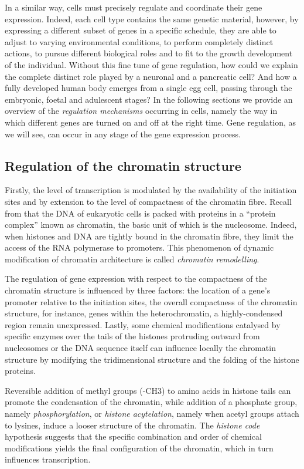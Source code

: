 In a similar way, cells must precisely regulate and coordinate their gene expression. Indeed, each cell type contains the same genetic material, however, by expressing a different subset of genes in a specific schedule, they are able to adjust to varying environmental conditions, to perform completely distinct actions, to pursue different biological roles and to fit to the growth development of the individual. Without this fine tune of gene regulation, how could we explain the complete distinct role played by a neuronal and a pancreatic cell? And how a fully developed human body emerges from a single egg cell, passing through the embryonic, foetal and adulescent stages? In the following sections we provide an overview of the \textit{regulation mechanisms} occurring in cells,  namely the way in which different genes are turned on and off at the right time. Gene regulation, as we will see, can occur in any stage of the gene expression process.

\subsection{Regulation of the chromatin structure}
Firstly, the level of transcription is modulated by the availability of the initiation sites and by extension to the level of compactness of the chromatin fibre.  Recall from   that the DNA of eukaryotic cells is packed with proteins in a \enquote{protein complex} known as chromatin, the basic unit of which is the nucleosome. Indeed, when histones and DNA are tightly bound in the chromatin fibre, they limit the access of the RNA polymerase to promoters. This phenomenon of dynamic modification of chromatin architecture is called \textit{chromatin remodelling}.


The regulation of gene expression with respect to the compactness of the chromatin structure is influenced by three factors: the location of a gene’s promoter relative to the initiation sites, the overall compactness of the chromatin structure, for instance, genes within the heterochromatin, a highly-condensed region remain unexpressed. Lastly, some chemical modifications catalysed by specific enzymes over the tails of the histones protruding outward from nucleosomes or the DNA sequence itself can influence locally the chromatin structure by modifying the tridimensional structure and the folding of the histone proteins. 

Reversible addition of methyl groups (-CH3) to amino acids in histone tails can promote the condensation of the chromatin, while addition of a phosphate group, namely \textit{phosphorylation},  or \textit{histone acytelation}, namely when acetyl groups attach to lysines, induce a looser structure of the chromatin. The \textit{histone code} hypothesis suggests that the specific combination and order of chemical modifications yields the final configuration of the chromatin, which in turn influences transcription.


